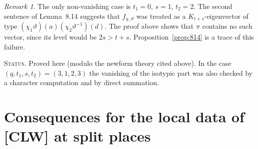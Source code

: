 \documentclass[11pt]{amsart}
\theoremstyle{definition}
\theoremstyle{remark}
\newtheorem{remark}[theorem]{Remark}
\newcommand{\status}[1]{\par\smallskip\noindent\textsc{Status.} #1\par\smallskip}
\begin{document}
\begin{remark}
The only non-vanishing case is $t_1=0$, $s=1$, $t_2=2$. The second sentence of Lemma~8.14 suggests that $f_{\chi,\vartheta}$ was treated as a $K_{t+s}$-eigenvector of type $(\chi_1\vartheta)(a)(\chi_2\vartheta^{-1})(d)$. The proof above shows that $\pi$ contains no such vector, since its level would be $2s>t+s$. Proposition~\ref{prop:814} is a trace of this failure.
\end{remark}

\status{Proved here (modulo the newform theory cited above). In the case $(q,t_1,s,t_2)=(3,1,2,3)$ the vanishing of the isotypic part was also checked by a character computation and by direct summation.}

\section{Consequences for the local data of [CLW] at split places}\label{sec:clw}
\end{document}
